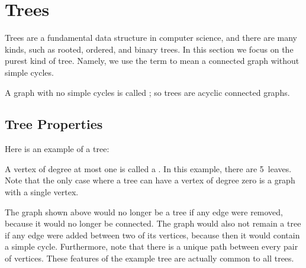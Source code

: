 
\begin{problems}
\classproblems
{}
\homeworkproblems
{}


\homeworkproblems
{}
\end{problems}


\section{Trees}\label{trees-sec}
Trees are a fundamental data structure in computer science, and there are
many kinds, such as rooted, ordered, and binary trees.  In this section
we focus on the purest kind of tree.  Namely, we use the term  to
mean a connected graph without simple cycles.

A graph with no simple cycles is called ; so trees are
acyclic connected graphs.

\subsection{Tree Properties}

Here is an example of a tree:


A vertex of degree at most one is called a .  In this example, there are 5~leaves. Note 
that the only case where a tree can have a vertex of degree zero is a graph with a single
vertex.

The graph shown above would no longer be a tree if any edge were removed,
because it would no longer be connected.  The graph would also not remain
a tree if any edge were added between two of its vertices, because then it
would contain a simple cycle.  Furthermore, note that there is a unique
path between every pair of vertices.  These features of the example tree
are actually common to all trees.

